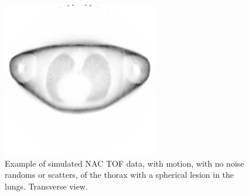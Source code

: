                 \begin{figure}
                    \centering
                    
                    \includegraphics[width=1.0\linewidth]{figures/background_nac_example.png}
                    
                    \captionsetup{singlelinecheck=false, justification=raggedright}
                    \caption{Example of simulated \gls{NAC} \gls{TOF} data, with motion, with no noise randoms or scatters, of the thorax with a spherical lesion in the lungs. Transverse view.} \label{fig:combined_pet_ct_nac_tof_example}
                \end{figure}
                
